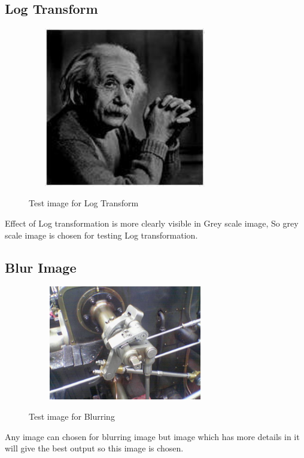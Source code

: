 \documentclass{article}
\begin{document}
\subsection{Log Transform}
\begin{figure}[htb]

\begin{minipage}[b]{1.0\linewidth}
  \centering
  \centerline{\includegraphics[width=8.5cm,height=7cm,keepaspectratio]{log_tst.jpg}}
  \centerline{Test image for Log Transform\cite{WEBSITE:16}}\medskip
\end{minipage}
%
\end{figure}
Effect of Log transformation is more clearly visible in Grey scale image, So grey scale image is chosen for testing Log transformation.

\subsection{Blur Image}
\begin{figure}[htb]

\begin{minipage}[b]{1.0\linewidth}
  \centering
  \centerline{\includegraphics[width=8.5cm,height=5cm,keepaspectratio]{edges.png}}
  \centerline{Test image for Blurring\cite{WEBSITE:14}}\medskip
\end{minipage}
%
\end{figure}
Any image can chosen for blurring image but image which has more details in it will give the best output so this image is chosen.
\end{document}
